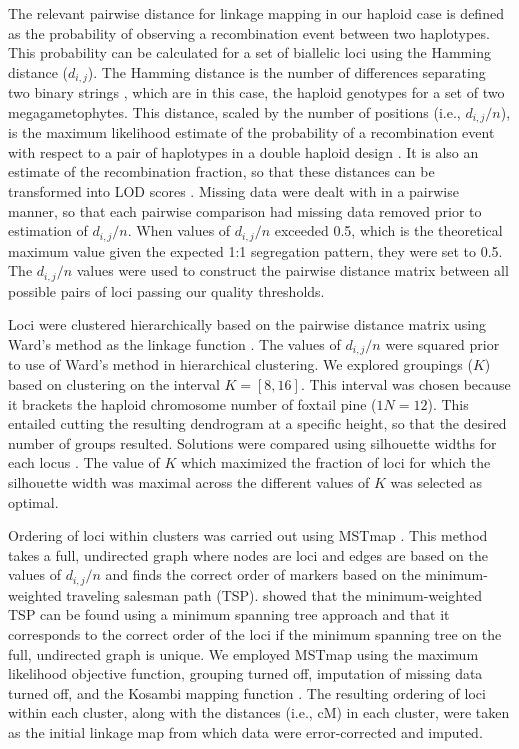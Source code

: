 \documentclass[smallextended]{svjour3}
\begin{document}
The relevant pairwise distance for linkage mapping in our haploid case is defined as the probability 
of observing a recombination event between two haplotypes. This probability can be calculated for a set of 
biallelic loci using the Hamming distance ($d_{i,j}$).
The Hamming distance is the number of differences separating two binary strings \citep{Hamming:1950}, which are 
in this case, the haploid genotypes for a set of two megagametophytes. 
This distance, scaled by the number of positions (i.e., $d_{i,j}/n$), 
is the maximum likelihood estimate of the probability of a recombination event with respect to a pair of haplotypes 
in a double haploid design \citep{Wu:2008a}. It is also an estimate of the recombination fraction, so that these distances can be transformed into LOD 
scores \citep[see][]{Morton:1955}. Missing data were dealt with in a pairwise manner, so that each pairwise comparison had 
missing data removed prior to estimation of $d_{i,j}/n$. When values of $d_{i,j}/n$ exceeded 0.5, which is the theoretical maximum 
value given the expected 1:1 segregation pattern, they were set to 0.5.  The $d_{i,j}/n$ values were used to construct the 
pairwise distance matrix between all possible pairs of loci passing our quality thresholds.

Loci were clustered hierarchically based on the pairwise distance matrix using Ward's method as the linkage function \citep{Ward:1963}.
The values of $d_{i,j}/n$ were squared prior to use of Ward's method in hierarchical clustering.
We explored groupings ($K$) based on clustering on the interval $K=[8,16]$. This interval was 
chosen because it brackets the haploid chromosome number of foxtail pine ($1N = 12$). This entailed 
cutting the resulting dendrogram at a specific height, so that the desired number of groups resulted. 
Solutions were compared using silhouette widths for each locus \citep{Rousseeuw:1987}. 
The value of $K$ which maximized the fraction of loci for which the silhouette width was maximal 
across the different values of $K$ was selected as optimal.

Ordering of loci within clusters was carried out using MSTmap \citep{Wu:2008a}. This method takes a full, undirected graph where 
nodes are loci and edges are based on the values of $d_{i,j}/n$ and finds the correct order of markers based on the minimum-weighted 
traveling salesman path (TSP). \citet{Wu:2008a} showed that the minimum-weighted TSP can be found using a minimum spanning tree approach 
and that it corresponds to the correct order of the loci if the minimum spanning tree on the full, undirected graph is unique. We 
employed MSTmap using the maximum likelihood objective function, grouping turned off, imputation of missing data turned off, and the 
Kosambi mapping function \citep{Kosambi:1944}. The resulting ordering of loci within each cluster, along with the distances (i.e., cM) 
in each cluster, were taken as the initial linkage map from which data were error-corrected and imputed.
\end{document}
